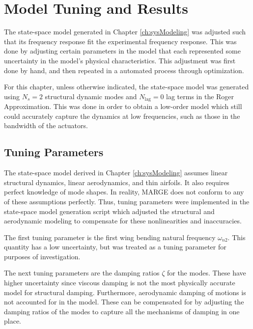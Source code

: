\chapter{Model Tuning and Results}
\label{ch:tuning}

The state-space model generated in Chapter \ref{ch:sysModeling} was adjusted such that its frequency response fit the experimental frequency response. This was done by adjusting certain parameters in the model that each represented some uncertainty in the model's physical characteristics. This adjustment was first done by hand, and then repeated in a automated process through optimization.

For this chapter, unless otherwise indicated, the state-space model was generated using $N_s=2$ structural dynamic modes and $N_\text{lag}=0$ lag terms in the Roger Approximation. This was done in order to obtain a low-order model which still could accurately capture the dynamics at low frequencies, such as those in the bandwidth of the actuators.


\section{Tuning Parameters} %

The state-space model derived in Chapter \ref{ch:sysModeling} assumes linear structural dynamics, linear aerodynamics, and thin airfoils. It also requires perfect knowledge of mode shapes. In reality, MARGE does not conform to any of these assumptions perfectly. Thus, tuning parameters were implemented in the state-space model generation script which adjusted the structural and aerodynamic modeling to compensate for these nonlinearities and inaccuracies.

The first tuning parameter is the first wing bending natural frequency $\omega_{n2}$. This quantity has a low uncertainty, but was treated as a tuning parameter for purposes of investigation.

The next tuning parameters are the damping ratios $\zeta$ for the modes. These have higher uncertainty since viscous damping is not the most physically accurate model for structural damping. Furthermore, aerodynamic damping of motions is not accounted for in the model. These can be compensated for by adjusting the damping ratios of the modes to capture all the mechanisms of damping in one place.

